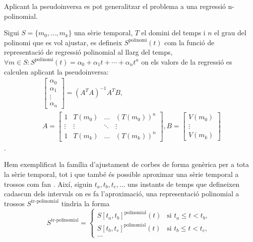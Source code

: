 Aplicant la pseudoinversa es pot generalitzar el problema a
una regressió n-polinomial.
\begin{definition}
  Sigui $S=\{m_0,\ldots,m_k\}$ una sèrie temporal, $T$ el domini del
  temps i $n$ el grau del polinomi que es vol ajustar, es defineix
  $S^{\text{polinomi}}(t)$ com la funció de representació de regressió
  polinomial al llarg del temps, $\forall m \in S:
  S^{\text{polinomi}}(t)=\alpha_0 + \alpha_1 t + \dotsb +\alpha_n t^n$
  on els valors de la regressió es calculen aplicant la pseudoinversa:
  \begin{align*}
    & 
    \left[\begin{array}{c}
        \alpha_0 \\
        \alpha_1\\
        \vdots \\
        \alpha_n
      \end{array}\right] 
    = (A^TA)^{-1}A^TB, \\
    &  A=\left[\begin{array}{cccc}
        1 & T(m_0) & \dots & (T(m_0))^n \\
        \vdots & \vdots & \ddots & \vdots  \\
        1 & T(m_k) & \dots & (T(m_k))^n 
      \end{array}\right],
    B=\left[\begin{array}{c}
        V(m_0) \\
        \vdots \\
        V(m_k)
      \end{array}\right]     
   \end{align*}.
\end{definition}



Hem exemplificat la família d'ajustament de corbes de forma genèrica
per a tota la sèrie temporal, tot i que també és possible aproximar
una sèrie temporal a trossos com fan \textcite{last01}. Així, siguin
$t_a,t_b,t_c,\ldots$ uns instants de temps que defineixen cadascun dels
intervals on es fa l'aproximació, una representació polinomial a
trossos $S^\text{tr-polinomial}$  tindria la forma
\[
S^\text{tr-polinomial}=
\begin{cases}
S[t_a,t_b]^\text{polinomial}(t) & \text{si } t_a \leq t < t_b, \\
S[t_b,t_c]^\text{polinomial}(t) & \text{si } t_b \leq t < t_c, \\
\dots
\end{cases}
\]


